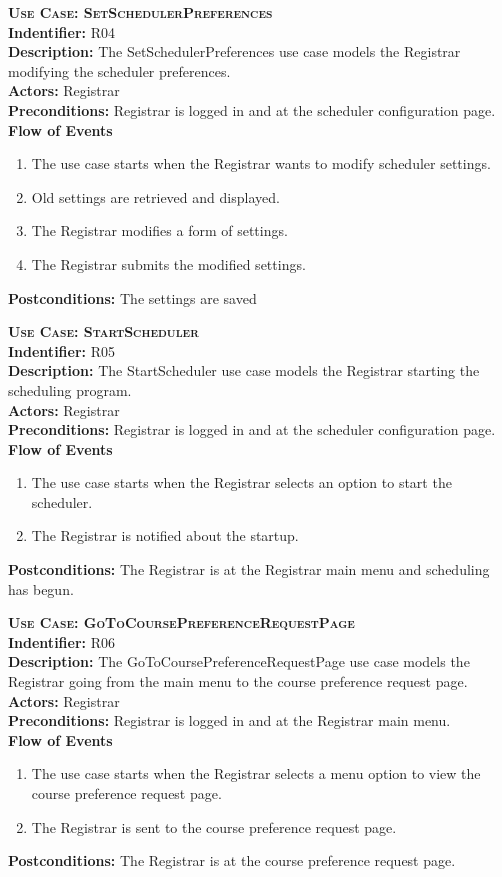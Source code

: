 \documentclass[11pt]{article}
\newenvironment{usecase}{%
	\def\title##1{ {\large \bfseries  \scshape {Use Case:} ##1} \\ }
 	\def\id##1{{\bf Indentifier:} ##1\\}
	\def\des##1{ {\bf Description:} ##1\\}
	\def\actors##1{ {\bf Actors:} ##1\\}
    	\def\pre##1{ {\bf Preconditions:} ##1 \\} %
    	\def\flow##1{ {\bf Flow of Events} ##1}%
    	\newenvironment{ucenum}{%
        	\begin{enumerate}[nolistsep]\small}%
        	{\end{enumerate}}
	\def\post##1{ {\bf Postconditions:} ##1 \\}
}{\vspace{.05in}}
\begin{document}
\begin{usecase}
  \title{SetSchedulerPreferences}
  \id{R04}
  \des{The SetSchedulerPreferences use case models the Registrar modifying the scheduler preferences.}
  \actors{Registrar}
  \pre{Registrar is logged in and at the scheduler configuration page.}
  \flow{}
  \begin{ucenum}
  \item The use case starts when the Registrar wants to modify scheduler settings.
  \item Old settings are retrieved and displayed.
  \item The Registrar modifies a form of settings.
  \item The Registrar submits the modified settings.
  \end{ucenum}
  \post{The settings are saved}
\end{usecase}

\begin{usecase}
  \title{StartScheduler}
  \id{R05}
  \des{The StartScheduler use case models the Registrar starting the scheduling program.}
  \actors{Registrar}
  \pre{Registrar is logged in and at the scheduler configuration page.}
  \flow{}
  \begin{ucenum}
  \item The use case starts when the Registrar selects an option to start the scheduler.
  \item The Registrar is notified about the startup.
  \end{ucenum}
  \post{The Registrar is at the Registrar main menu and scheduling has begun.}
\end{usecase}

\begin{usecase}
  \title{GoToCoursePreferenceRequestPage}
  \id{R06}
  \des{The GoToCoursePreferenceRequestPage use case models the Registrar going from the main menu to the course preference request page.}
  \actors{Registrar}
  \pre{Registrar is logged in and at the Registrar main menu.}
  \flow{}
  \begin{ucenum}
  \item The use case starts when the Registrar selects a menu option to view the course preference request page.
  \item The Registrar is sent to the course preference request page.
  \end{ucenum}
  \post{The Registrar is at the course preference request page.}
\end{usecase}
\end{document}
